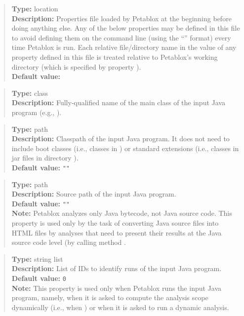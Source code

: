 \begin{quote}
{\bf Type:} location \\
{\bf Description:} Properties file loaded by Petablox at the
beginning before doing anything else.  Any of the below properties may
be defined in this file to avoid defining them on the command line
(using the ``'' format) every time Petablox is run.
Each relative file/directory name in the value of any property defined
in this file is treated relative to Petablox's working directory (which
is specified by property ). \\
{\bf Default value:} 
\end{quote}

\begin{quote}
{\bf Type:} class \\
{\bf Description:} Fully-qualified name of the main class of the input Java program (e.g., ).
\end{quote}

\begin{quote}
{\bf Type:} path \\
{\bf Description:} Classpath of the input Java program.  It does not need to include
boot classes (i.e., classes in ) or
standard extensions (i.e., classes in jar files in directory ). \\
{\bf Default value:} {\tt ""}
\end{quote}

\begin{quote}
{\bf Type:} path \\
{\bf Description:} Source path of the input Java program. \\
{\bf Default value:} {\tt ""} \\
{\bf Note:} Petablox analyzes only Java bytecode, not Java source code.  This property is used only by the task of converting Java source files into HTML files by analyses that need to present their results at the Java source code level (by calling method .
\end{quote}

\begin{quote}
{\bf Type:} string list \\
{\bf Description:} List of IDs to identify runs of the input Java program. \\
{\bf Default value:} {\tt 0} \\
{\bf Note:} This property is used only when Petablox runs the input Java program, namely, when it is asked to compute the analysis scope dynamically (i.e., when ) or when it is asked to run a dynamic analysis. 
\end{quote}

